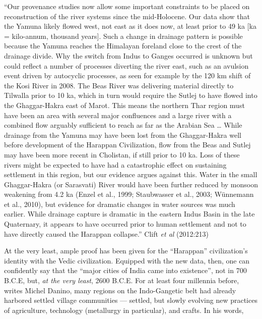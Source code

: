 \begin{myquote}
“Our provenance studies now allow some important constraints to be placed on reconstruction of the river systems since the mid-Holocene. Our data show that the Yamuna likely flowed west, not east as it does now, at least prior to 49 ka [ka = kilo-annum, thousand years]. Such a change in drainage pattern is possible because the Yamuna reaches the Himalayan foreland close to the crest of the drainage divide. Why the switch from Indus to Ganges occurred is unknown but could reflect a number of processes diverting the river east, such  as an avulsion event driven by autocyclic processes, as seen for example by the 120 km shift of the Kosi River in 2008. The Beas River was delivering material directly to Tilwalla prior to 10 ka, which in turn would require the Sutlej to have flowed into the Ghaggar-Hakra east of Marot. This means the northern Thar region must have been an area with several major confluences and a large river with a combined flow arguably sufficient to reach as far as the Arabian Sea … While drainage from the Yamuna may have been lost from the Ghaggar-Hakra well before development of the Harappan Civilization, flow from the Beas and Sutlej may have been more recent in Cholistan, if still prior to 10 ka. Loss of these rivers might be expected to have had a catastrophic effect on sustaining settlement in this region, but our evidence argues against this. Water in the small Ghaggar-Hakra (or Sarasvati) River would have been further reduced by monsoon weakening from 4.2 ka (Enzel et al., 1999; Staubwasser et al., 2003; Wünnemann et al., 2010), but evidence for dramatic changes in water sources was much earlier. While drainage capture is dramatic in the eastern Indus Basin in the late Quaternary, it appears to have occurred prior to human settlement and not to have directly caused the Harappan collapse.”
\hfill Clift {\sl et al} (2012:213)
\end{myquote}

At the very least, ample proof has been given for the “Harappan” civilization’s identity with the Vedic civilization. Equipped with the new data, then, one can confidently say that the “major cities of India came into existence”, not in 700 B.C.E, but, {\sl at the very least}, 2600 B.C.E. For at least four millennia before, writes Michel Danino, many regions on the Indo-Gangetic belt had already harbored settled village communities --- settled, but slowly evolving new practices of agriculture, technology (metallurgy in particular), and crafts. In his words, 

